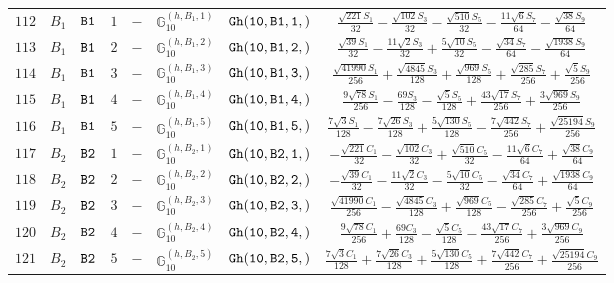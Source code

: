 \documentclass[fleqn,8pt]{jsarticle}
\begin{document}
\begin{table}[ht!]
\begin{center}
\begin{tabular}{cccccccc}
$ 112 $ & $ B_{1} $ & $ {\tt B1} $ & $ 1 $ & $ - $ & $ \mathbb{G}_{10}^{(h,B_{1},1)} $ & $ {\tt Gh(10,B1,1,)} $ & $ \frac{\sqrt{221} S_{1}}{32} - \frac{\sqrt{102} S_{3}}{32} - \frac{\sqrt{510} S_{5}}{32} - \frac{11 \sqrt{6} S_{7}}{64} - \frac{\sqrt{38} S_{9}}{64} $ \\
$ 113 $ & $ B_{1} $ & $ {\tt B1} $ & $ 2 $ & $ - $ & $ \mathbb{G}_{10}^{(h,B_{1},2)} $ & $ {\tt Gh(10,B1,2,)} $ & $ \frac{\sqrt{39} S_{1}}{32} - \frac{11 \sqrt{2} S_{3}}{32} + \frac{5 \sqrt{10} S_{5}}{32} - \frac{\sqrt{34} S_{7}}{64} - \frac{\sqrt{1938} S_{9}}{64} $ \\
$ 114 $ & $ B_{1} $ & $ {\tt B1} $ & $ 3 $ & $ - $ & $ \mathbb{G}_{10}^{(h,B_{1},3)} $ & $ {\tt Gh(10,B1,3,)} $ & $ \frac{\sqrt{41990} S_{1}}{256} + \frac{\sqrt{4845} S_{3}}{128} + \frac{\sqrt{969} S_{5}}{128} + \frac{\sqrt{285} S_{7}}{256} + \frac{\sqrt{5} S_{9}}{256} $ \\
$ 115 $ & $ B_{1} $ & $ {\tt B1} $ & $ 4 $ & $ - $ & $ \mathbb{G}_{10}^{(h,B_{1},4)} $ & $ {\tt Gh(10,B1,4,)} $ & $ \frac{9 \sqrt{78} S_{1}}{256} - \frac{69 S_{3}}{128} - \frac{\sqrt{5} S_{5}}{128} + \frac{43 \sqrt{17} S_{7}}{256} + \frac{3 \sqrt{969} S_{9}}{256} $ \\
$ 116 $ & $ B_{1} $ & $ {\tt B1} $ & $ 5 $ & $ - $ & $ \mathbb{G}_{10}^{(h,B_{1},5)} $ & $ {\tt Gh(10,B1,5,)} $ & $ \frac{7 \sqrt{3} S_{1}}{128} - \frac{7 \sqrt{26} S_{3}}{128} + \frac{5 \sqrt{130} S_{5}}{128} - \frac{7 \sqrt{442} S_{7}}{256} + \frac{\sqrt{25194} S_{9}}{256} $ \\
$ 117 $ & $ B_{2} $ & $ {\tt B2} $ & $ 1 $ & $ - $ & $ \mathbb{G}_{10}^{(h,B_{2},1)} $ & $ {\tt Gh(10,B2,1,)} $ & $ - \frac{\sqrt{221} C_{1}}{32} - \frac{\sqrt{102} C_{3}}{32} + \frac{\sqrt{510} C_{5}}{32} - \frac{11 \sqrt{6} C_{7}}{64} + \frac{\sqrt{38} C_{9}}{64} $ \\
$ 118 $ & $ B_{2} $ & $ {\tt B2} $ & $ 2 $ & $ - $ & $ \mathbb{G}_{10}^{(h,B_{2},2)} $ & $ {\tt Gh(10,B2,2,)} $ & $ - \frac{\sqrt{39} C_{1}}{32} - \frac{11 \sqrt{2} C_{3}}{32} - \frac{5 \sqrt{10} C_{5}}{32} - \frac{\sqrt{34} C_{7}}{64} + \frac{\sqrt{1938} C_{9}}{64} $ \\
$ 119 $ & $ B_{2} $ & $ {\tt B2} $ & $ 3 $ & $ - $ & $ \mathbb{G}_{10}^{(h,B_{2},3)} $ & $ {\tt Gh(10,B2,3,)} $ & $ \frac{\sqrt{41990} C_{1}}{256} - \frac{\sqrt{4845} C_{3}}{128} + \frac{\sqrt{969} C_{5}}{128} - \frac{\sqrt{285} C_{7}}{256} + \frac{\sqrt{5} C_{9}}{256} $ \\
$ 120 $ & $ B_{2} $ & $ {\tt B2} $ & $ 4 $ & $ - $ & $ \mathbb{G}_{10}^{(h,B_{2},4)} $ & $ {\tt Gh(10,B2,4,)} $ & $ \frac{9 \sqrt{78} C_{1}}{256} + \frac{69 C_{3}}{128} - \frac{\sqrt{5} C_{5}}{128} - \frac{43 \sqrt{17} C_{7}}{256} + \frac{3 \sqrt{969} C_{9}}{256} $ \\
$ 121 $ & $ B_{2} $ & $ {\tt B2} $ & $ 5 $ & $ - $ & $ \mathbb{G}_{10}^{(h,B_{2},5)} $ & $ {\tt Gh(10,B2,5,)} $ & $ \frac{7 \sqrt{3} C_{1}}{128} + \frac{7 \sqrt{26} C_{3}}{128} + \frac{5 \sqrt{130} C_{5}}{128} + \frac{7 \sqrt{442} C_{7}}{256} + \frac{\sqrt{25194} C_{9}}{256} $ \\
 \hline \hline
\end{tabular}
\end{center}
\end{table}
\end{document}
